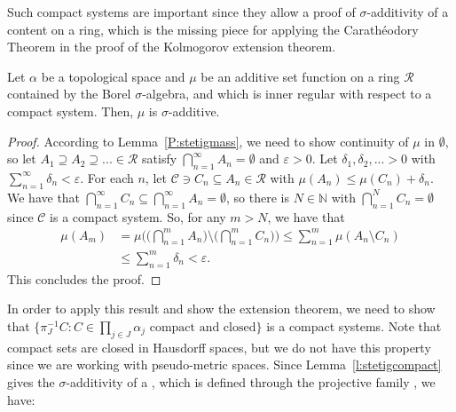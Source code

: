\documentclass[lean]{AFM}
\begin{document}
\noindent
Such compact systems are important since they allow a
proof of $\sigma$-additivity of a content on a ring, which is the
missing piece for applying the Carathéodory Theorem in the proof of
the Kolmogorov extension theorem.

\begin{lemma}\label{l:stetigcompact}
  Let $\alpha$ be a topological space and $\mu$ be an additive set
  function on a ring $\mathcal R$ contained by the Borel
  $\sigma$-algebra, and which is inner regular with respect to a
  compact system. Then, $\mu$ is $\sigma$-additive.
\end{lemma}

\begin{proof}
  According to Lemma~\ref{P:stetigmass}, we need to show continuity of
  $\mu$ in $\emptyset$, so let $A_1 \supseteq A_2 \supseteq... \in
  \mathcal R$ satisfy $\bigcap_{n=1}^\infty A_n = \emptyset$ and
  $\varepsilon>0$. Let $\delta_1, \delta_2,... >0$ with
  $\sum_{n=1}^\infty \delta_n < \varepsilon$. For each $n$, let
  $\mathcal C \ni C_n \subseteq A_n \in \mathcal R$ with $\mu(A_n)
  \leq \mu(C_n) + \delta_n$. We have that $\bigcap_{n=1}^\infty C_n
  \subseteq \bigcap_{n=1}^\infty A_n = \emptyset$, so there is $N \in
  \mathbb N$ with $\bigcap_{n=1}^N C_n = \emptyset$ since $\mathcal C$
  is a compact system. So, for any $m>N$, we have that
  \begin{align*}
     \mu(A_m) & = \mu\Big( \Big(\bigcap_{n=1}^m A_n\Big) \setminus
     \Big(\bigcap_{n=1}^m C_n\Big)\Big) \leq \sum_{n=1}^m \mu(A_n
     \setminus C_n) \\ & \leq \sum_{n=1}^m \delta_n < \varepsilon.
  \end{align*}
  This concludes the proof.
\end{proof}

In order to apply this result and show the extension theorem, we need
to show that
$\{\pi_J^{-1} C: C \in \prod_{j\in J} \alpha_j \text{ compact and
  closed}\}$ is a compact systems. Note that compact sets are closed
in Hausdorff spaces, but we do not have this property since we are
working with pseudo-metric spaces. Since Lemma~\ref{l:stetigcompact}
gives the $\sigma$-additivity of a , which
is defined through the projective family , we have:

\end{document}
